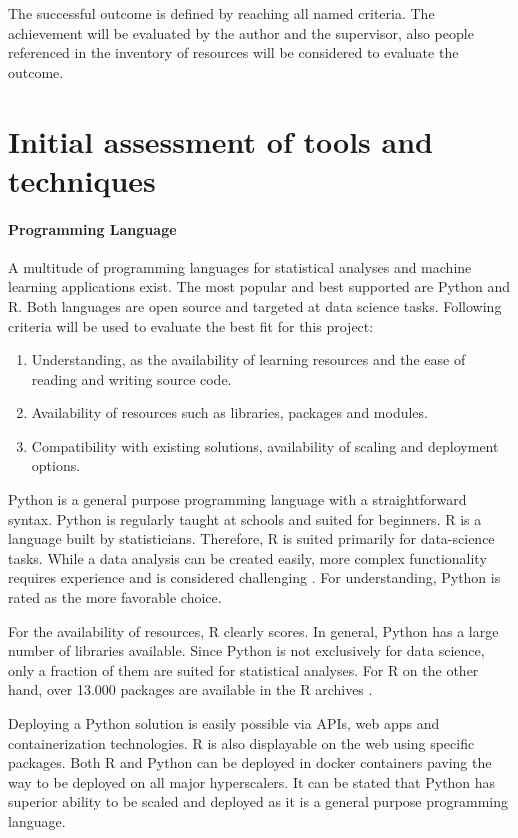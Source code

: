The successful outcome is defined by reaching all named criteria. The achievement will be evaluated by the author and the supervisor, also people referenced in the inventory of resources will be considered to evaluate the outcome.


\section{Initial assessment of tools and techniques}

\paragraph{Programming Language}
A multitude of programming languages for statistical analyses and machine learning applications exist. The most popular and best supported are Python and R. Both languages are open source and targeted at data science tasks.
Following criteria will be used to evaluate the best fit for this project:
\begin{enumerate}
\item Understanding, as the availability of learning resources and the ease of reading and writing source code.
\item Availability of resources such as libraries, packages and modules.
\item Compatibility with existing solutions, availability of scaling and deployment options.
\end{enumerate}

Python is a general purpose programming language with a straightforward syntax. Python is regularly taught at schools and suited for beginners. R is a language built by statisticians. Therefore, R is suited primarily for data-science tasks. While a data analysis can be created easily, more complex functionality requires experience and is considered challenging \cite{pythonVsR}. For understanding, Python is rated as the more favorable choice.

For the availability of resources, R clearly scores. In general, Python has a large number of libraries available. Since Python is not exclusively for data science, only a fraction of them are suited for statistical analyses. For R on the other hand, over 13.000 packages are available in the R archives \cite{pythonVsR}.

Deploying a Python solution is easily possible via APIs, web apps and containerization technologies. R is also displayable on the web using specific packages. Both R and Python can be deployed in docker containers \cite{rDocker} \cite{pythonDocker} paving the way to be deployed on all major hyperscalers.
It can be stated that Python has superior ability to be scaled and deployed as it is a general purpose programming language. 

